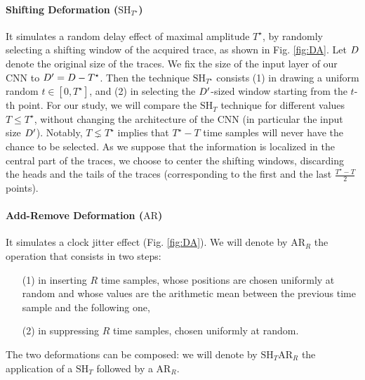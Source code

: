 \paragraph*{Shifting Deformation ($\mathrm{SH}_{T^\star}$)} It simulates a random delay effect of maximal amplitude $T^\star$, by randomly selecting  a shifting window of the acquired trace, as shown in Fig. \ref{fig:DA}. Let $D$ denote the original size of the traces. We fix the size of the input layer of our CNN to $D^\prime = D - T^\star$. Then the technique $\mathrm{SH}_{T^\star}$  consists (1) in drawing a uniform random $t \in[0,T^\star]$, and (2) in selecting the $D^\prime$-sized window starting from the $t$-th point. For our study, we will compare the $\mathrm{SH}_T$ technique for different values $T \leq T^\star$, without changing the architecture of the CNN (in particular the input size $D^\prime$). Notably, $T \lneq T^\star$ implies that $T^\star-T$ time samples will never have the chance to be selected. As we suppose that the information is localized in the central part of the traces, we choose to center the shifting windows, discarding the heads and the tails of the traces (corresponding to the first and the last $\frac{T^\star-T}{2}$ points). 

\paragraph*{Add-Remove Deformation ($\mathrm{AR}$)}  It simulates a clock jitter effect (Fig. \ref{fig:DA}). We will denote by $\mathrm{AR}_R$ the operation that consists in two steps:
\begin{itemize}
\item[(1)] in inserting $R$ time samples, whose positions are chosen uniformly at random and whose values are the arithmetic mean between the previous time sample and the following one,
\item[(2)] in suppressing $R$ time samples, chosen uniformly at random.\\
\end{itemize}

The two deformations can be composed: we will denote by $\mathrm{SH}_T\mathrm{AR}_R$ the application of a $\mathrm{SH}_T$ followed by a $\mathrm{AR}_R$.


